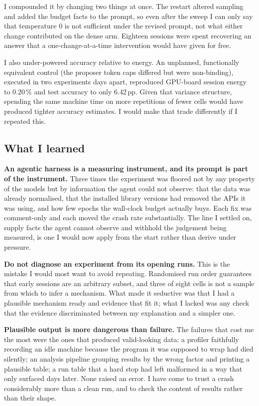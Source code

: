 I compounded it by changing two things at once. The restart altered sampling and
added the budget facts to the prompt, so even after the sweep I can only say that
temperature 0 is not sufficient under the revised prompt, not what either change contributed on the
dense arm. Eighteen sessions were spent recovering an answer that a
one-change-at-a-time intervention would have given for free.

I also under-powered accuracy relative to energy. An unplanned, functionally
equivalent control (the proposer token caps differed but were non-binding),
executed in two experiments days apart, reproduced GPU-board session energy to
0.20\,\% and test accuracy to only 6.42\,pp. Given that
variance structure, spending the same machine time on more repetitions of fewer
cells would have produced tighter accuracy estimates. I would make that trade
differently if I repeated this.

\subsection{What I learned}

\textbf{An agentic harness is a measuring instrument, and its prompt is part of
the instrument.} Three times the experiment was floored not by any property of
the models but by information the agent could not observe: that the data was
already normalised, that the installed library versions had removed the APIs it
was using, and how few epochs the wall-clock budget actually buys. Each fix was
comment-only and each moved the crash rate substantially. The line I settled on,
supply facts the agent cannot observe and withhold the judgement being measured,
is one I would now apply from the start rather than derive under pressure.

\textbf{Do not diagnose an experiment from its opening runs.} This is the
mistake I would most want to avoid repeating. Randomised run order guarantees
that early sessions are an arbitrary subset, and three of eight cells is not a
sample from which to infer a mechanism. What made it seductive was that I had a
plausible mechanism ready and evidence that fit it; what I lacked was any check
that the evidence discriminated between my explanation and a simpler one.

\textbf{Plausible output is more dangerous than failure.} The failures that cost
me the most were the ones that produced valid-looking data: a profiler faithfully
recording an idle machine because the program it was supposed to wrap had died
silently; an analysis pipeline grouping results by the wrong factor and printing
a plausible table; a run table that a hard stop had left malformed in a way that
only surfaced days later. None raised an error. I have come to trust a crash considerably more than
a clean run, and to check the content of results rather than their shape.


